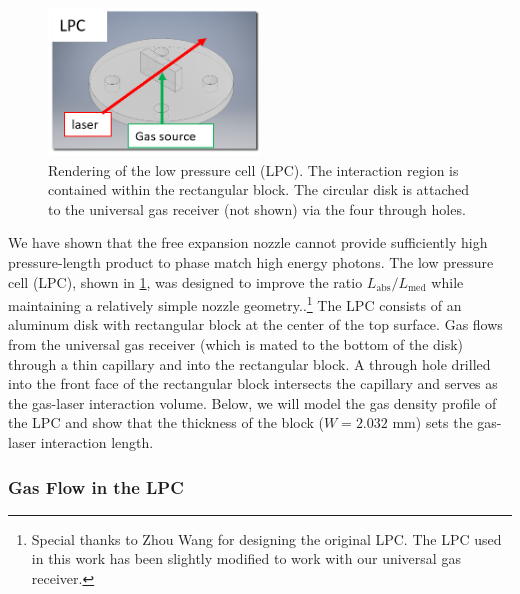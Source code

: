 \begin{figure}
	\centering
	\includegraphics[width=0.5\textwidth]{figures/chap3/LPC_diagram.png}
	\caption{Rendering of the low pressure cell (LPC). The interaction region is contained within the rectangular block. The circular disk is attached to the universal gas receiver (not shown) via the four through holes.}
	\label{fig:LPC_diagram}
\end{figure}

We have shown that the free expansion nozzle cannot provide sufficiently high pressure-length product to phase match high energy photons. The low pressure cell (LPC), shown in \cref{fig:LPC_diagram}, was designed to improve the ratio $L_{\textrm{abs}} / L_{\textrm{med}}$ while maintaining a relatively simple nozzle geometry.\cite{wangMidinfraredStrongfieldLaser2018}.\footnote{Special thanks to Zhou Wang for designing the original LPC. The LPC used in this work has been slightly modified to work with our universal gas receiver.} The LPC consists of an aluminum disk with rectangular block at the center of the top surface. Gas flows from the universal gas receiver (which is mated to the bottom of the disk) through a thin capillary and into the rectangular block. A through hole drilled into the front face of the rectangular block intersects the capillary and serves as the gas-laser interaction volume. Below, we will model the gas density profile of the LPC and show that the thickness of the block ($W = 2.032$ mm) sets the gas-laser interaction length.

\subsubsection{Gas Flow in the LPC}

